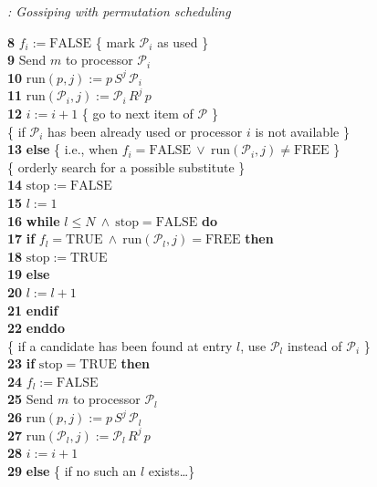 \documentclass{elsart}
\newcommand{\keyw}[1]{\hbox{\bf #1}}
\begin{document}
\begin{alg}{\emph{: Gossiping with permutation scheduling}}
\begin{tabbing}
{\bf 8} \> \> \> \> \> $f_i := \mathrm{FALSE}$ \>\>\>\>\>\>\>\> \{ mark $\mathcal{P}_i$ as used \} \\
{\bf 9} \> \> \> \> \> Send $m$ to processor $\mathcal{P}_i$ \\
{\bf 10} \> \> \> \> \> $\mathrm{run}(p,  j) :=  p\, S^{j}\, \mathcal{P}_i$ \\
{\bf 11} \> \> \> \> \> $\mathrm{run}(\mathcal{P}_i, j) :=  \mathcal{P}_i\, R^{j}\, p$ \\
{\bf 12} \> \> \> \> \> $i := i + 1$ \>\>\>\>\>\>\>\> \{ go to next item of $\mathcal{P}$ \} \\
         \> \> \> \> \{ if $\mathcal{P}_i$ has been already used or processor $i$ is not available \} \\
{\bf 13} \> \> \> \> \keyw{else} \>\>\>\>\>\>\>\>\> \{ i.e., when $f_i = \mathrm{FALSE} \ \vee \ \mathrm{run}(\mathcal{P}_i, j) \neq \mathrm{FREE}$ \} \\
         \> \> \> \> \> \{ orderly search for a possible substitute \} \\
{\bf 14} \> \> \> \> \> $\mathrm{stop} := \mathrm{FALSE}$ \\
{\bf 15} \> \> \> \> \> $l := 1$ \\
{\bf 16} \> \> \> \> \> \keyw{while} $l \leq N \ \wedge \ \mathrm{stop} = \mathrm{FALSE}$ \keyw{do} \\
{\bf 17} \> \> \> \> \> \> \keyw{if} $f_l = \mathrm{TRUE}  \ \wedge \ \mathrm{run}(\mathcal{P}_l, j) = \mathrm{FREE}$
			   \keyw{then}\\
{\bf 18} \> \> \> \> \> \> \> $\mathrm{stop} := \mathrm{TRUE}$\\
{\bf 19} \> \> \> \> \> \> \keyw{else}\\
{\bf 20} \> \> \> \> \> \> \> $l := l+1$\\
{\bf 21} \> \> \> \> \> \> \keyw{endif}\\
{\bf 22} \> \> \> \> \> \keyw{enddo}\\
         \> \> \> \> \> \{ if a candidate has been found at entry $l$, use $\mathcal{P}_l$ instead of $\mathcal{P}_i$ \} \\
{\bf 23} \> \> \> \> \> \keyw{if} $\mathrm{stop} = \mathrm{TRUE}$ \keyw{then} \\
{\bf 24} \> \> \> \> \> \> $f_l := \mathrm{FALSE}$ \\
{\bf 25} \> \> \> \> \> \> Send $m$ to processor $\mathcal{P}_l$ \\
{\bf 26} \> \> \> \> \> \> $\mathrm{run}(p,  j) :=  p\, S^{j}\, \mathcal{P}_l$ \\
{\bf 27} \> \> \> \> \> \> $\mathrm{run}(\mathcal{P}_l, j) :=  \mathcal{P}_l\, R^{j}\, p$ \\
{\bf 28} \> \> \> \> \> \> $i := i + 1$ \\
{\bf 29} \> \> \> \> \> \keyw{else} \>\>\>\>\>\>\>\> \{ if no such an $l$ exists\ldots \} \\


\end{tabbing}
\end{alg}
\end{document}
